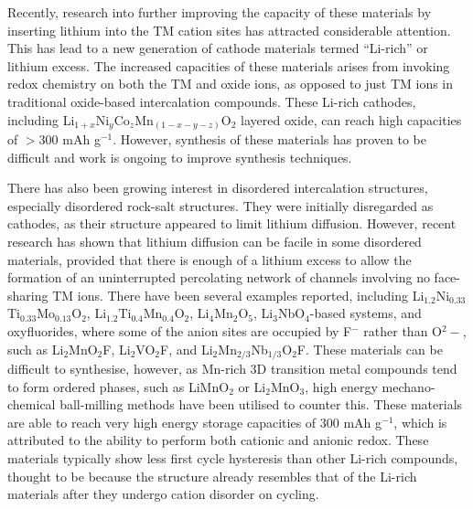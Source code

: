 \documentclass[../main.tex]{subfiles}
\begin{document}
Recently, research into further improving the capacity of these materials by inserting lithium into the TM cation sites has attracted considerable attention. This has lead to a new generation of cathode materials termed ``Li-rich'' or lithium excess. The increased capacities of these materials arises from invoking redox chemistry on both the TM and oxide ions, as opposed to just TM ions in traditional oxide-based intercalation compounds. \cite{Sathiya2013,lee2014unlocking,Oishi2015,Seo2016,Gent2017,Assat2018,naylor2019depth,House2020,House2020a} These Li-rich cathodes, including Li$_{1+x}$Ni$_y$Co$_z$Mn$_{(1-x-y-z)}$O$_2$ layered oxide, can reach high capacities of $>300$ mAh g$^{-1}$. However, synthesis of these materials has proven to be difficult and work is ongoing to improve synthesis techniques.\cite{Hy2016} 

There has also been growing interest in disordered intercalation structures, especially disordered rock-salt structures. They were initially disregarded as cathodes, as their structure appeared to limit lithium diffusion. However, recent research has shown that lithium diffusion can be facile in some disordered materials, provided that there is enough of a lithium excess to allow the formation of an uninterrupted percolating network of channels involving no face-sharing TM ions.\cite{lee2014unlocking,Urban2014,Lee2015} There have been several examples reported, including Li$_{1.2}$Ni$_{0.33}$Ti$_{0.33}$Mo$_{0.13}$O$_2$,\cite{Lee2015} Li$_{1.2}$Ti$_{0.4}$Mn$_{0.4}$O$_2$,\cite{Yabuuchi2016a} Li$_4$Mn$_2$O$_5$,\cite{Freire2016,Yao2018,Bhandari2019454} Li$_3$NbO$_4$-based systems,\cite{Nakajima2017,Yabuuchi2015,Wang2015} and oxyfluorides, where some of the anion sites are occupied by F$^-$ rather than O$^2-$, such as Li$_2$MnO$_2$F,\cite{Sharpe2020,House2018,Lun2020} Li$_2$VO$_2$F,\cite{Chen2015,Chen2015a,Baur2019, Cambaz2019, Baur2020, Kallquist2019, Chang2020} and Li$_2$Mn$_{2/3}$Nb$_{1/3}$O$_2$F.\cite{Lee2018} These materials can be difficult to synthesise, however, as Mn-rich 3D transition metal compounds tend to form ordered phases, such as LiMnO$_2$ or Li$_2$MnO$_3$, high energy mechano-chemical ball-milling methods have been utilised to counter this.\cite{Freire2016,House2018,Freire2017} These materials are able to reach very high energy storage capacities of $300$ mAh g$^{-1}$,\cite{Jacquet2019} which is attributed to the ability to perform both cationic and anionic redox.\cite{Jacquet2019,clement2020,Chang2020} These materials typically show less first cycle hysteresis than other Li-rich compounds, thought to be because the structure already resembles that of the Li-rich materials after they undergo cation disorder on cycling.
\end{document}
